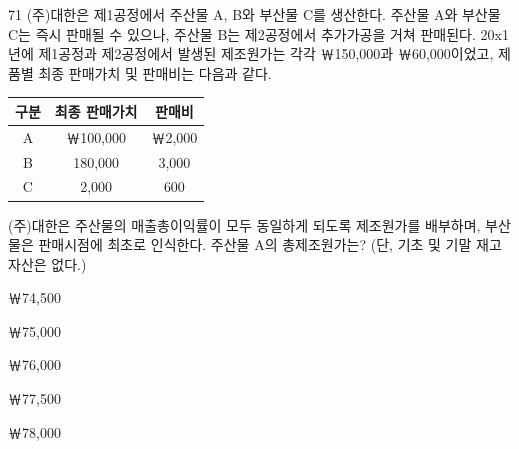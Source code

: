 \begin{question}{71}
(주)대한은 제1공정에서 주산물 A, B와 부산물 C를 생산한다. 주산물 A와 부산물 C는 즉시 판매될 수 있으나, 주산물 B는 제2공정에서 추가가공을 거쳐 판매된다. 20x1년에 제1공정과 제2공정에서 발생된 제조원가는 각각 ￦150,000과 ￦60,000이었고, 제품별 최종 판매가치 및 판매비는 다음과 같다.
\par{\small\centering\begin{tabular}{|c|c|c|}
\hline
구분 & 최종 판매가치 & 판매비 \\ \hline
A & ￦100,000 & ￦2,000 \\ \hline
B & 180,000 & 3,000 \\ \hline
C & 2,000 & 600 \\ \hline
\end{tabular}\par}
(주)대한은 주산물의 매출총이익률이 모두 동일하게 되도록 제조원가를 배부하며, 부산물은 판매시점에 최초로 인식한다. 주산물 A의 총제조원가는? (단, 기초 및 기말 재고자산은 없다.) \par
\begin{choices}
  \item ￦74,500
  \item ￦75,000
  \item ￦76,000
  \item ￦77,500
  \item ￦78,000
\end{choices}
\end{question}
